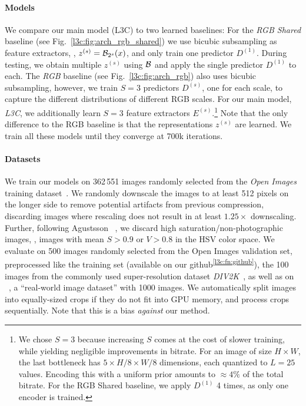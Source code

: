 \paragraph{Models} We compare our main model (L3C) to two learned baselines:
For the \emph{RGB Shared} baseline (see Fig.~\ref{l3c:fig:arch_rgb_shared}) we use bicubic subsampling as feature extractors, \ie, $z^{(s)}=\mathcal{B}_{2^s}(x)$, and only train one predictor $D^{(1)}$. During testing, we obtain multiple $z^{(s)}$ using $\mathcal{B}$ and apply the single predictor $D^{(1)}$ to each.
The \emph{RGB} baseline (see Fig.~\ref{l3c:fig:arch_rgb}) also uses bicubic subsampling, however, we train $S=3$ predictors $D^{(s)}$, one for each scale, to capture the different distributions of different RGB scales.
For our main model, \emph{L3C}, we additionally learn $S=3$ feature extractors $E^{(s)}$.\footnote{We chose $S=3$ because increasing $S$ comes at the cost of slower training, while yielding negligible improvements in bitrate. For an image of size $H{\times}W$, the last bottleneck has $5{\times}H/8{\times}W/8$ dimensions, each quantized to $L=25$ values. Encoding this with a uniform prior amounts to ${\approx}4\%$ of the total bitrate. For the RGB Shared baseline, we apply $D^{(1)}$ 4 times, as only one encoder is trained.}
Note that the only difference to the RGB baseline is that the representations $z^{(s)}$ are learned. We train all these models until they converge at 700k iterations. 

\paragraph{Datasets}
We train our models on 362\,551 images randomly selected from the \emph{Open Images} training dataset~\cite{OpenImages}.
We randomly downscale the images to at least 512 pixels on the longer side to remove potential artifacts from previous compression, discarding images where rescaling does not result in at least $1.25\times$ downscaling.
%
Further, following Agustsson \etal~\cite{agustsson2017soft}, we discard high saturation/non-photographic images, \ie, images with mean $S{>}0.9$ or $V{>}0.8$ in the HSV color space.
%
We evaluate on 500 images randomly selected from the Open Images validation set, 
preprocessed like the training set (available on our github\textsuperscript{\ref{l3c:fn:github}}), the 100 images from the commonly used super-resolution dataset \emph{DIV2K}~\cite{agustssondiv2k},
as well as on \emph{\raisek}~\cite{dang2015raise}, a ``real-world image dataset'' with 1000 images. We automatically split images into equally-sized crops if they do not fit into GPU memory,
and process crops sequentially. Note that this is a bias \emph{against} our method.

